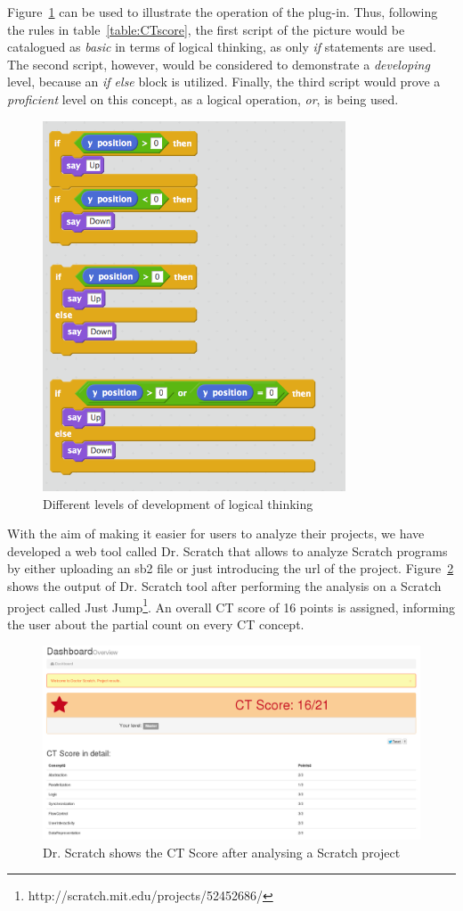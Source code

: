 \documentclass[a4paper,11pt]{article}
\begin{document}
Figure~\ref{fig:logic} can be used to illustrate the operation of the plug-in. Thus, following the rules in table~\ref{table:CTscore}, the first script of the picture would be catalogued as \textit{basic} in terms of logical thinking, as only \textit{if} statements are used. The second script, however, would be considered to demonstrate a \textit{developing} level, because an \textit{if else} block is utilized. Finally, the third script would prove a \textit{proficient} level on this concept, as a logical operation, \textit{or}, is being used.
\begin{figure}
  \centering
    \includegraphics[width=9cm]{img/Logic.png}
    \caption{Different levels of development of logical thinking}
    \label{fig:logic}
\end{figure}

With the aim of making it easier for users to analyze their projects, we have developed a web tool called Dr. Scratch that allows to analyze Scratch programs by either uploading an sb2 file or just introducing the url of the project. Figure~\ref{fig:drscratch} shows the output of Dr. Scratch tool after performing the analysis on a Scratch project called Just Jump\footnote{http://scratch.mit.edu/projects/52452686/}. An overall CT score of 16 points is assigned, informing the user about the partial count on every CT concept.
\begin{figure}
  \centering
    \includegraphics[width=13cm]{img/results.png}
    \caption{Dr. Scratch shows the CT Score after analysing a Scratch project}
    \label{fig:drscratch}
\end{figure}
\end{document}
